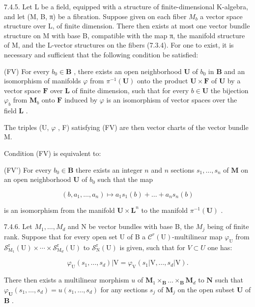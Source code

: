 7.4.5. Let L be a field, equipped with a structure of finite-dimensional K-algebra, and let (M, B, π) be a fibration. Suppose given on each fiber \(M_{b}\) a vector space structure over L, of finite dimension. There then exists at most one vector bundle structure on M with base B, compatible with the map π, the manifold structure of M, and the L-vector structures on the fibers (7.3.4). For one to exist, it is necessary and sufficient that the following condition be satisfied:

(FV) For every \(b_0 \in \mathbf{B}\) , there exists an open neighborhood \(\mathbf{U}\) of \(b_0\) in \(\mathbf{B}\) and an isomorphism of manifolds \(\varphi\) from \(\pi^{-1}(\mathbf{U})\) onto the product \(\mathbf{U} \times \mathbf{F}\) of \(\mathbf{U}\) by a vector space \(\mathbf{F}\) over \(\mathbf{L}\) of finite dimension, such that for every \(b \in \mathbf{U}\) the bijection \(\varphi_b\) from \(\mathbf{M}_b\) onto \(\mathbf{F}\) induced by \(\varphi\) is an isomorphism of vector spaces over the field \(\mathbf{L}\) .

The triples (U, \(\varphi\) , F) satisfying (FV) are then vector charts of the vector bundle M.

Condition (FV) is equivalent to:

(FV') For every \(b_0 \in \mathbf{B}\) there exists an integer \(n\) and \(n\) sections \(s_1, \ldots, s_n\) of \(\mathbf{M}\) on an open neighborhood \(\mathbf{U}\) of \(b_0\) such that the map

\[
(b, a _ {1}, \dots , a _ {n}) \mapsto a _ {1} s _ {1} (b) + \dots + a _ {n} s _ {n} (b)
\]

is an isomorphism from the manifold \(\mathbf{U} \times \mathbf{L}^{n}\) to the manifold \(\pi^{-1}(\mathbf{U})\) .

7.4.6. Let \(M_{1},\ldots,M_{d}\) and N be vector bundles with base B, the \(M_{j}\) being of finite rank. Suppose that for every open set U of B a \(\mathcal{C}^{r}(\mathrm{U})\)-multilinear map \(\varphi_{\mathrm{U}}\) from \(\mathcal{S}_{\mathrm{M}_{1}}^{\mathrm{r}}(\mathrm{U})\times\cdots\times\mathcal{S}_{\mathrm{M}_{d}}^{\mathrm{r}}(\mathrm{U})\) to \(\mathcal{S}_{\mathrm{N}}^{\mathrm{r}}(\mathrm{U})\) is given, such that for \(V \subset U\) one has:

\[
\varphi_ {\mathrm{U}} (s _ {1}, \dots , s _ {d}) | \mathrm{V} = \varphi_ {\mathrm{V}} (s _ {1} | \mathrm{V}, \dots , s _ {d} | \mathrm{V}).
\]

There then exists a multilinear morphism \(u\) of \(\mathbf{M}_1 \times_{\mathbf{B}} \ldots \times_{\mathbf{B}} \mathbf{M}_d\) to \(\mathbf{N}\) such that \(\varphi_{\mathbf{U}}(s_1, \ldots, s_d) = u(s_1, \ldots, s_d)\) for any sections \(s_j\) of \(\mathbf{M}_j\) on the open subset \(\mathbf{U}\) of \(\mathbf{B}\) .

